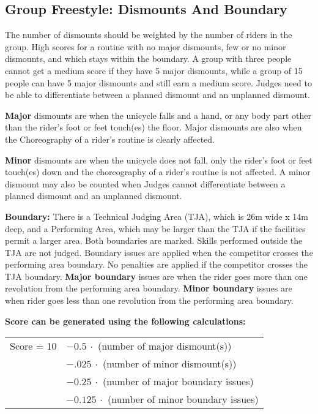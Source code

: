 \subsection{Group Freestyle: Dismounts And Boundary \label{subsec:freestyle_group-additional-judging-criteria_dismounts-boundary}}
The number of dismounts should be weighted by the number of riders in the group.
High scores for a routine with no major dismounts, few or no minor dismounts, and which stays within the boundary.
A group with three people cannot get a medium score if they have 5 major dismounts, while a group of 15 people can have 5 major dismounts and still earn a medium score.
Judges need to be able to differentiate between a planned dismount and an unplanned dismount.

\textbf{Major} dismounts are when the unicycle falls and a hand, or any body part other than the rider's foot or feet touch(es) the floor.
Major dismounts are also when the Choreography of a rider's routine is clearly affected.

\textbf{Minor} dismounts are when the unicycle does not fall, only the rider's foot or feet touch(es) down and the choreography of a rider's routine is not affected.
A minor dismount may also be counted when Judges cannot differentiate between a planned dismount and an unplanned dismount.

\textbf{Boundary:} There is a Technical Judging Area (TJA), which is 26m wide x 14m deep, and a Performing Area, which may be larger than the TJA if the facilities permit a larger area.
Both boundaries are marked.
Skills performed outside the TJA are not judged.
Boundary issues are applied when the competitor crosses the performing area boundary.
No penalties are applied if the competitor crosses the TJA boundary.
\textbf{Major boundary }issues are when the rider goes more than one revolution from the performing area boundary.
\textbf{Minor boundary} issues are when rider goes less than one revolution from the performing area boundary.

\textbf{Score can be generated using the following calculations:}  \\
\begin{tabular}{r l}
Score = 10 & $- 0.5\ \cdot$ (number of major dismount(s)) \\
 & $- .025\ \cdot$ (number of minor dismount(s)) \\
 & $- 0.25\ \cdot$ (number of major boundary issues) \\
& $- 0.125\ \cdot$ (number of minor boundary issues) \\
\end{tabular}

